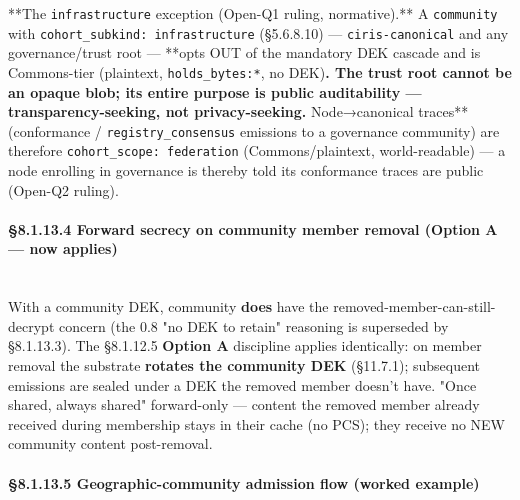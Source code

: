 \documentclass[11pt]{article}
\begin{document}
**The \texttt{infrastructure} exception (Open-Q1 ruling, normative).** A \texttt{community} with \texttt{cohort\_subkind: infrastructure} (§5.6.8.10) — \texttt{ciris-canonical} and any governance/trust root — **opts OUT of the mandatory DEK cascade and is Commons-tier (plaintext, \texttt{holds\_bytes:*}, no DEK)\textbf{. The trust root cannot be an opaque blob; its entire purpose is public auditability — transparency-seeking, not privacy-seeking. }Node→canonical traces** (conformance / \texttt{registry\_consensus} emissions to a governance community) are therefore \texttt{cohort\_scope: federation} (Commons/plaintext, world-readable) — a node enrolling in governance is thereby told its conformance traces are public (Open-Q2 ruling).


\paragraph{§8.1.13.4 Forward secrecy on community member removal (Option A — now applies)}\mbox{}\\


With a community DEK, community \textbf{does} have the removed-member-can-still-decrypt concern (the 0.8 "no DEK to retain" reasoning is superseded by §8.1.13.3). The §8.1.12.5 \textbf{Option A} discipline applies identically: on member removal the substrate \textbf{rotates the community DEK} (§11.7.1); subsequent emissions are sealed under a DEK the removed member doesn't have. "Once shared, always shared" forward-only — content the removed member already received during membership stays in their cache (no PCS); they receive no NEW community content post-removal.


\paragraph{§8.1.13.5 Geographic-community admission flow (worked example)}\mbox{}\\
\end{document}
